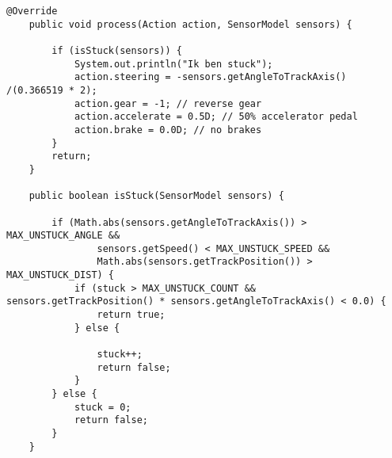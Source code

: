 \begin{lstlisting}
@Override
    public void process(Action action, SensorModel sensors) {

        if (isStuck(sensors)) {
            System.out.println("Ik ben stuck");
            action.steering = -sensors.getAngleToTrackAxis() /(0.366519 * 2);
            action.gear = -1; // reverse gear
            action.accelerate = 0.5D; // 50% accelerator pedal
            action.brake = 0.0D; // no brakes
        }
        return;
    }

    public boolean isStuck(SensorModel sensors) {

        if (Math.abs(sensors.getAngleToTrackAxis()) > MAX_UNSTUCK_ANGLE &&
                sensors.getSpeed() < MAX_UNSTUCK_SPEED &&
                Math.abs(sensors.getTrackPosition()) > MAX_UNSTUCK_DIST) {
            if (stuck > MAX_UNSTUCK_COUNT && sensors.getTrackPosition() * sensors.getAngleToTrackAxis() < 0.0) {
                return true;
            } else {

                stuck++;
                return false;
            }
        } else {
            stuck = 0;
            return false;
        }
    }

\end{lstlisting}